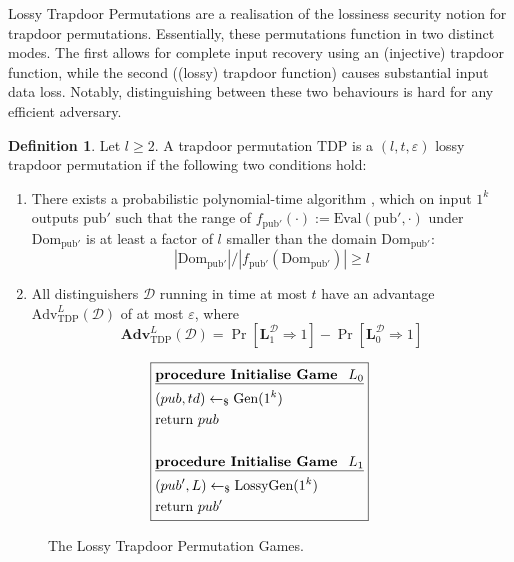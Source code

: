 \documentclass[]{final_report}
\theoremstyle{definition}
\newtheorem{definition}{Definition}[chapter]
\begin{document}
Lossy Trapdoor Permutations are a realisation of the lossiness security notion for trapdoor permutations. Essentially, these permutations function in two distinct modes. The first allows for complete input recovery using an (injective) trapdoor function, while the second ((lossy) trapdoor function) causes substantial input data loss. Notably, distinguishing between these two behaviours is hard for any efficient adversary.

\begin{definition}
Let \( l \geq 2 \). A trapdoor permutation \( \text{TDP} \) is a \( (l, t, \varepsilon) \) lossy trapdoor permutation if the following two conditions hold:

\begin{enumerate}
    \item There exists a probabilistic polynomial-time algorithm , which on input \( 1^k \) outputs \( \text{pub}' \) such that the range of \( f_{\text{pub}'}(\cdot) := \text{Eval}(\text{pub}', \cdot) \) under \( \text{Dom}_{\text{pub}'} \) is at least a factor of \( l \) smaller than the domain \( \text{Dom}_{\text{pub}'} \): 
    \[ |\text{Dom}_{\text{pub}'}|/|f_{\text{pub}'}(\text{Dom}_{\text{pub}'})| \geq l \]
    
    \item All distinguishers \( \mathcal{D} \) running in time at most \( t \) have an advantage \( \text{Adv}^L_{\text{TDP}}(\mathcal{D}) \) of at most \( \varepsilon \), where
    \[ \textbf{Adv}^L_{\text{TDP}}(\mathcal{D}) = \Pr[\textbf{L}_{1}^{\mathcal{D}}  \Rightarrow 1] - \Pr[\textbf{L}_{0}^{\mathcal{D}} \Rightarrow 1] \]
\end{enumerate}
\end{definition}

\begin{figure}[H]
\[
\boxed{
\begin{aligned}
&\underline{\textbf{\text{procedure Initialise Game } \(L_0\)}} \\
&(pub, td) \leftarrow_\$ \text{Gen}(1^k) \\
&\text{return } pub \\
\\
&\underline{\textbf{\text{procedure Initialise Game } \(L_1\)}} \\
&(pub', L) \leftarrow_\$ \text{LossyGen}(1^k) \\
&\text{return } pub' \\
\end{aligned}
}
\]
\caption{The Lossy Trapdoor Permutation Games.}
\label{fig:lossy_trapdoor_permutation_games}
\end{figure}
\end{document}
